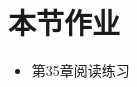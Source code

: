 \documentclass[17pt]{beamer}
\begin{document}
\section{本节作业}

\begin{frame}{\insertsection}
  \begin{itemize}
    \item 第35章阅读练习
  \end{itemize}
\end{frame}
\end{document}
